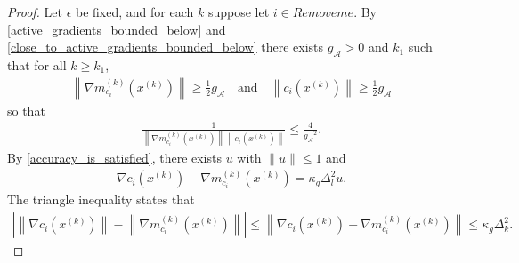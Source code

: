 \documentclass{article}
\newenvironment{comment}
  {\par\medskip
   \color{red}%
   \begin{framed}
   \textbf{Comment: }\ignorespaces}
 {\end{framed}
  \medskip}
\theoremstyle{case}
\numberwithin{theorem}{subsection}
\newcommand{\dk}{\Delta_k}
\newcommand{\gmcik}{{\nabla m_{c_i}^{(k)}\left(\xk\right)}}
\newcommand{\maxgrad}{{M_{\nabla}}}
\newcommand{\minactivegrad}{{ g_{\mathcal A} }}
\newcommand{\xk}{x^{(k)}}
\newcommand{\activeprojk}{{Remove me}}
\begin{document}
\begin{proof}

Let $\epsilon$ be fixed, and for each $k$ suppose let $i \in \activeprojk$.
By \cref{active_gradients_bounded_below} and \cref{close_to_active_gradients_bounded_below} there exists $\minactivegrad > 0$ and $k_1$ such that for all $k \ge k_1$,
\begin{align*}
\left\|\gmcik \right\| \ge \frac 1 2 \minactivegrad
\quad \textrm{and} \quad
\left\|c_i\left(\xk\right)\right\| \ge \frac 1 2 \minactivegrad
\end{align*}
so that
\begin{align}
\frac {1} {\left\|\gmcik \right\|  \left\|c_i\left(\xk\right)\right\|  } \le \frac 4 {\minactivegrad^2}. \label{zikac_what_i_need_to_multiply}
\end{align}
By \cref{accuracy_is_satisfied}, there exists $u$ with $\|u\| \le 1$ and
\begin{align*}
\nabla c_i\left( \xk \right) - \gmcik = \kappa_g \Delta_{l}^2 u.
\end{align*}
The triangle inequality states that
\begin{align}
\label{zikac_asdfasdffdsafdsa}
\left|\left\|\nabla c_i\left(\xk \right)\right\|  - \left\|\gmcik\right\|\right| \le \left\|\nabla c_i\left( \xk \right) - \gmcik\right\| \le \kappa_g \dk^2.
\end{align}

\end{proof}
\end{document}
